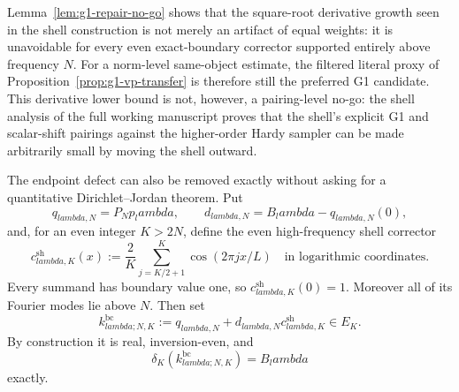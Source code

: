 \documentclass[11pt]{article}
\def\lambda{lambda}%
\theoremstyle{remark}
\begin{document}
Lemma~\ref{lem:g1-repair-no-go} shows that the square-root derivative growth
seen in the shell construction is not merely an artifact of equal weights: it
is unavoidable for every even exact-boundary corrector supported entirely
above frequency $N$.  For a norm-level same-object estimate, the filtered
literal proxy of Proposition~\ref{prop:g1-vp-transfer} is therefore still the
preferred G1 candidate.  This derivative lower bound is not, however, a
pairing-level no-go: the shell analysis of the full working manuscript proves that the
shell's explicit G1 and scalar-shift pairings against the higher-order Hardy
sampler can be made arbitrarily small by moving the shell outward.

The endpoint defect can also be removed exactly without asking for a
quantitative Dirichlet--Jordan theorem.  Put
\[
 q_{\lambda,N}=P_Np_\lambda,
 \qquad
 d_{\lambda,N}=B_\lambda-q_{\lambda,N}(0),
\]
and, for an even integer $K>2N$, define the even high-frequency shell
corrector
\begin{equation}\label{eq:g1-shell-corrector}
 c^{\mathrm{sh}}_{\lambda,K}(x)
 :=\frac{2}{K}\sum_{j=K/2+1}^{K}\cos(2\pi jx/L)
 \quad\text{in logarithmic coordinates}.
\end{equation}
Every summand has boundary value one, so
$c^{\mathrm{sh}}_{\lambda,K}(0)=1$.  Moreover all of its Fourier modes lie
above $N$.  Then set
\begin{equation}\label{eq:g1-bc-candidate}
 k^{\mathrm{bc}}_{\lambda;N,K}
 :=q_{\lambda,N}+d_{\lambda,N}c^{\mathrm{sh}}_{\lambda,K}\in E_K.
\end{equation}
By construction it is real, inversion-even, and
\begin{equation}\label{eq:g1-bc-boundary}
 \delta_K(k^{\mathrm{bc}}_{\lambda;N,K})=B_\lambda
\end{equation}
exactly.
\end{document}

